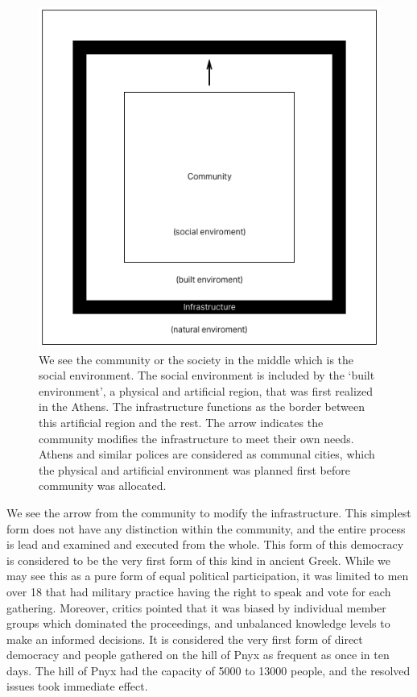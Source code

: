 \begin{figure}
  \includegraphics[width=\textwidth]{chapters/2/fig/primitive.png}               
  \caption[layers of environments]{ We see the community or the society in the middle
    which is the social environment. The social environment is included by the
    `built environment', a physical and artificial region, that was first
    realized in the Athens. The infrastructure functions as the border between
    this artificial region and the rest. The arrow indicates the community
    modifies the infrastructure to meet their own needs. Athens and similar
    polices are considered as communal cities, which the physical and
  artificial environment was planned first before community was allocated.}
  \label{fig:diagram_primitive}
\end{figure}

We see the arrow from the community to modify the infrastructure. This
simplest form does not have any distinction within the community, and the
entire process is lead and examined and executed from the whole.
This form of this democracy is considered to be the very first form
of this kind in ancient Greek. While we may see this as a pure form of
equal political participation, it was limited to men over 18 that had
military practice having the right to speak and vote for each gathering.
Moreover, critics pointed that it was biased by individual member groups
which dominated the proceedings, and unbalanced knowledge levels to make an
informed decisions. It is considered the very first form of direct
democracy and people gathered on the hill of Pnyx as frequent as once in
ten days. The hill of Pnyx had the capacity of 5000 to 13000 people, and
the resolved issues took immediate effect.

